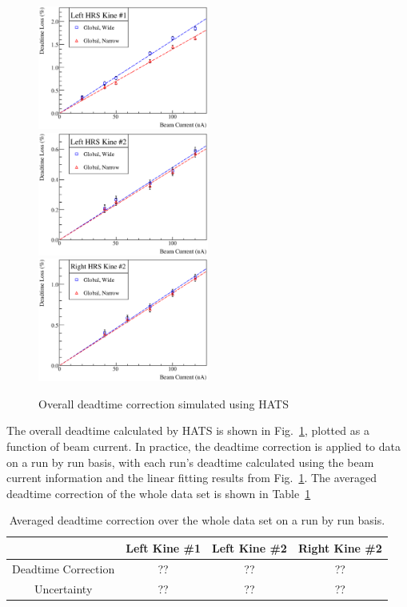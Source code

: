 \begin{figure}[!htp]
  \includegraphics[width=0.5\textwidth,angle=0]{DW/Fig8_1.eps}
  \includegraphics[width=0.5\textwidth,angle=0]{DW/Fig8_2.eps}
  \includegraphics[width=0.5\textwidth,angle=0]{DW/Fig8_3.eps}
  \caption{Overall deadtime correction simulated using HATS}\label{fig:hats_dtoverall}
\end{figure}

The overall deadtime calculated by HATS is shown in Fig.~\ref{fig:hats_dtoverall}, plotted as a function of beam current. In practice, the deadtime correction is applied to data on a run by run basis, with each run's deadtime calculated using the beam current information and the linear fitting results from Fig.~\ref{fig:hats_dtoverall}. The averaged deadtime correction of the whole data set is shown in Table~\ref{tab:dtcor}


\begin{table}[!htp]
  \centering
  \begin{tabular}{c|c|c|c}
    \hline
            &   Left Kine \#1    &   Left Kine \#2    &   Right Kine \#2 \\ \hline
    Deadtime Correction  &   ??  &   ??               &   ??    \\
    Uncertainty          &   ??  &   ??               &   ??  \\
    \hline
  \end{tabular}
  \caption{Averaged deadtime correction over the whole data set on a run by run basis. }\label{tab:dtcor}
\end{table}

